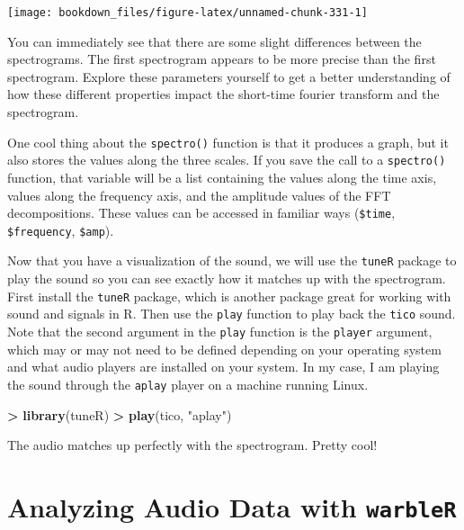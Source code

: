\documentclass[]{krantz}
\makeatletter
\newenvironment{Shaded}{\begin{snugshade}}{\end{snugshade}}
\newcommand{\KeywordTok}[1]{\textcolor[rgb]{0.27,0.27,0.27}{\textbf{#1}}}
\newcommand{\StringTok}[1]{\textcolor[rgb]{0.5,0.5,0.5}{#1}}
\newcommand{\OperatorTok}[1]{\textcolor[rgb]{0.43,0.43,0.43}{\textbf{#1}}}
\newcommand{\NormalTok}[1]{#1}
\newenvironment{kframe}{%
\medskip{}
\setlength{\fboxsep}{.8em}
 \def\at@end@of@kframe{}%
 \ifinner\ifhmode%
  \def\at@end@of@kframe{\end{minipage}}%
  \begin{minipage}{\columnwidth}%
 \fi\fi%
 \def\FrameCommand##1{\hskip\@totalleftmargin \hskip-\fboxsep
 \colorbox{shadecolor}{##1}\hskip-\fboxsep
     \hskip-\linewidth \hskip-\@totalleftmargin \hskip\columnwidth}%
 \MakeFramed {\advance\hsize-\width
   \@totalleftmargin\z@ \linewidth\hsize
   \@setminipage}}%
 {\par\unskip\endMakeFramed%
 \at@end@of@kframe}
\renewenvironment{Shaded}{\begin{kframe}}{\end{kframe}}
\makeatother
\begin{document}
\texttt{[image: bookdown\_files/figure-latex/unnamed-chunk-331-1]}

You can immediately see that there are some slight differences between
the spectrograms. The first spectrogram appears to be more precise than
the first spectrogram. Explore these parameters yourself to get a better
understanding of how these different properties impact the short-time
fourier transform and the spectrogram.

One cool thing about the \texttt{spectro()} function is that it produces
a graph, but it also stores the values along the three scales. If you
save the call to a \texttt{spectro()} function, that variable will be a
list containing the values along the time axis, values along the
frequency axis, and the amplitude values of the FFT decompositions.
These values can be accessed in familiar ways (\texttt{\$time},
\texttt{\$frequency}, \texttt{\$amp}).

Now that you have a visualization of the sound, we will use the
\texttt{tuneR} package to play the sound so you can see exactly how it
matches up with the spectrogram. First install the \texttt{tuneR}
package, which is another package great for working with sound and
signals in R. Then use the \texttt{play} function to play back the
\texttt{tico} sound. Note that the second argument in the \texttt{play}
function is the \texttt{player} argument, which may or may not need to
be defined depending on your operating system and what audio players are
installed on your system. In my case, I am playing the sound through the
\texttt{aplay} player on a machine running Linux.

\begin{Shaded}
\begin{Highlighting}[]
\OperatorTok{>}\StringTok{ }\KeywordTok{library}\NormalTok{(tuneR)}
\OperatorTok{>}\StringTok{ }\KeywordTok{play}\NormalTok{(tico, }\StringTok{"aplay"}\NormalTok{)}
\end{Highlighting}
\end{Shaded}

The audio matches up perfectly with the spectrogram. Pretty cool!

\section{\texorpdfstring{Analyzing Audio Data with
\texttt{warbleR}}{Analyzing Audio Data with warbleR}}\label{analyzing-audio-data-with-warbler}
\end{document}
